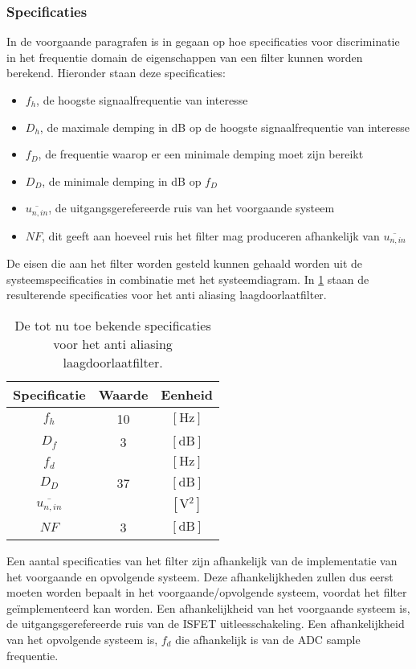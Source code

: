 \subsubsection{Specificaties}
In de voorgaande paragrafen is in gegaan op hoe specificaties voor discriminatie in het frequentie domain de eigenschappen van een filter kunnen worden berekend. Hieronder staan deze specificaties:
\begin{itemize}
    \item $f_h$, de hoogste signaalfrequentie van interesse
    \item $D_h$, de maximale demping in dB op de hoogste signaalfrequentie van interesse
    \item $f_D$, de frequentie waarop er een minimale demping moet zijn bereikt
    \item $D_D$, de minimale demping in dB op $f_D$
    \item $\overline{u_{n,in}}$, de uitgangsgerefereerde ruis van het voorgaande systeem
    \item $NF$, dit geeft aan hoeveel ruis het filter mag produceren afhankelijk van $\overline{u_{n,in}}$
\end{itemize}

De eisen die aan het filter worden gesteld kunnen gehaald worden uit de systeemspecificaties in combinatie met het systeemdiagram. In \cref{tab:prelimenarySpecsAAfilter} staan de resulterende specificaties voor het anti aliasing laagdoorlaatfilter.
\begin{table}[ht]
    \centering
    \begin{tabular}{c|c|c}
        Specificatie & Waarde & Eenheid \\\hline
        $f_h$ & 10 & $[\si{\hertz}]$\\
        $D_f$ & 3   & $[\mathrm{dB}]$ \\
        $f_d$ &  & $[\si{\hertz}]$ \\
        $D_D$ & 37   & $[\mathrm{dB}]$ \\
        $\overline{u_{n,in}}$ & & $[\si{\volt^2}]$\\
        $NF$ & 3 & $[\mathrm{dB}]$
    \end{tabular}
    \caption{De tot nu toe bekende specificaties voor het anti aliasing laagdoorlaatfilter.}
    \label{tab:prelimenarySpecsAAfilter}
\end{table}

Een aantal specificaties van het filter zijn afhankelijk van de implementatie van het voorgaande en opvolgende systeem. Deze afhankelijkheden zullen dus eerst moeten worden bepaalt in het voorgaande/opvolgende systeem, voordat het filter geïmplementeerd kan worden. Een afhankelijkheid van het voorgaande systeem is, de uitgangsgerefereerde ruis van de ISFET uitleesschakeling.
Een afhankelijkheid van het opvolgende systeem is, $f_d$ die afhankelijk is van de ADC sample frequentie.